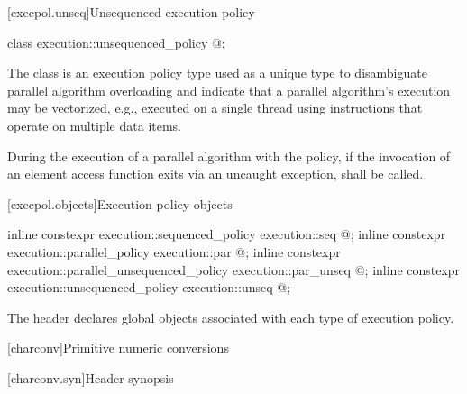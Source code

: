 [execpol.unseq]{Unsequenced execution policy}

%
\begin{itemdecl}
class execution::unsequenced_policy { @\unspec@ };
\end{itemdecl}

\pnum
The class  is an execution policy type
used as a unique type to disambiguate parallel algorithm overloading and
indicate that a parallel algorithm's execution may be vectorized,
e.g., executed on a single thread using instructions
that operate on multiple data items.

\pnum
During the execution of a parallel algorithm with
the  policy,
if the invocation of an element access function exits via an uncaught exception,
 shall be called.

[execpol.objects]{Execution policy objects}

%
%
%
%
%
%
\begin{itemdecl}
inline constexpr execution::sequenced_policy            execution::seq{ @\unspec@ };
inline constexpr execution::parallel_policy             execution::par{ @\unspec@ };
inline constexpr execution::parallel_unsequenced_policy execution::par_unseq{ @\unspec@ };
inline constexpr execution::unsequenced_policy          execution::unseq{ @\unspec@ };
\end{itemdecl}

\begin{itemdescr}
\pnum
The header  declares global objects associated with each type of execution policy.
\end{itemdescr}

[charconv]{Primitive numeric conversions}

[charconv.syn]{Header  synopsis}

